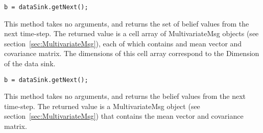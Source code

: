 
\ifmatlab
\begin{lstlisting}
b = dataSink.getNext();
\end{lstlisting}

This method takes no arguments, and returns the set of belief values from the next time-step.  The returned value is a cell array of MultivariateMsg objects (see section~\ref{sec:MultivariateMsg}), each of which contains and mean vector and covariance matrix.  The dimensions of this cell array correspond to the Dimension of the data sink.
\fi

\ifjava
\begin{lstlisting}
b = dataSink.getNext();
\end{lstlisting}

This method takes no arguments, and returns the belief values from the next time-step.  The returned value is a MultivariateMsg object (see section~\ref{sec:MultivariateMsg}) that contains the mean vector and covariance matrix. 
\fi



